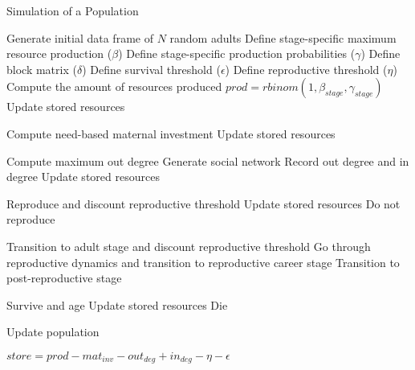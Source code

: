 \documentclass{article}
\begin{document}
\begin{algorithm}[H]
    \caption{Simulation of a Population}
    \begin{algorithmic}
    \State Generate initial data frame of $N$ random adults
    \State Define stage-specific maximum resource production ($\beta$)
    \State Define stage-specific production probabilities ($\gamma$)
    \State Define block matrix ($\delta$)
    \State Define survival threshold ($\epsilon$)
    \State Define reproductive threshold ($\eta$)
        \State Compute the amount of resources produced
        \State $prod = rbinom(1,\beta_{stage},\gamma_{stage})$
        \State Update stored resources
        
        \State Compute need-based maternal investment
        \State Update stored resources
        \EndIf
        
        \State Compute maximum out degree
        \State Generate social network
        \State Record out degree and in degree
        \State Update stored resources
        \EndIf
        
        \State Reproduce and discount reproductive threshold
        \State Update stored resources
        \Else
        \State Do not reproduce
        \EndIf
        
        \State Transition to adult stage and discount reproductive threshold
        \State Go through reproductive dynamics and transition to reproductive career stage
        \State Transition to post-reproductive stage
        \EndIf
        
        \State Survive and age
        \State Update stored resources
        \Else
        \State Die
        \EndIf
        
        \State Update population

        \EndFor
        \State $store = prod - mat_{inv} - out_{deg} + in_{deg} - \eta - \epsilon$

    \end{algorithmic} 
    \label{alg:people}
\end{algorithm} 

\clearpage



\end{document}
